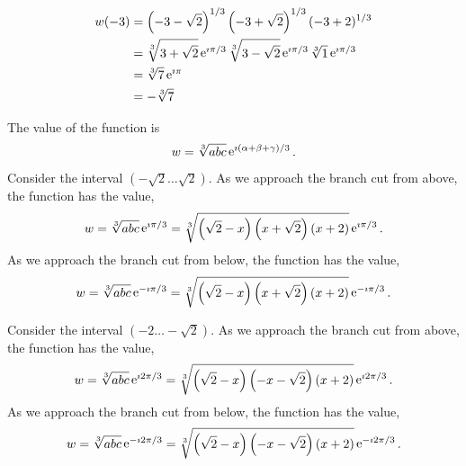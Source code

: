{\begin{Solution}
  \begin{align*}
    w(-3)   
    &= \left( -3 - \sqrt{2} \right)^{1/3}  \left( -3 + \sqrt{2} \right)^{1/3}  
    (-3 + 2)^{1/3} 
    \\
    &= \sqrt[3]{3 + \sqrt{2}} \mathop{\mathrm{e}}\nolimits^{\imath \pi / 3} 
    \sqrt[3]{3 - \sqrt{2}} \mathop{\mathrm{e}}\nolimits^{\imath \pi / 3} 
    \sqrt[3]{1} \mathop{\mathrm{e}}\nolimits^{\imath \pi / 3} 
    \\
    &= \sqrt[3]{7} \mathop{\mathrm{e}}\nolimits^{\imath \pi} 
    \\
    &= - \sqrt[3]{7}
  \end{align*}

  The value of the function is
  \[
  w = \sqrt[3]{a b c} \mathop{\mathrm{e}}\nolimits^{\imath (\alpha + \beta + \gamma) / 3}.
  \]
  Consider the interval $\left( -\sqrt{2} \ldots \sqrt{2} \right)$.  
  As we approach the branch cut from above, the function has the value,
  \[
  w = \sqrt[3]{a b c} \mathop{\mathrm{e}}\nolimits^{\imath \pi / 3} 
  = \sqrt[3]{ \left( \sqrt{2} - x \right)  \left( x + \sqrt{2} \right)
    (x + 2) } \mathop{\mathrm{e}}\nolimits^{\imath \pi / 3}.
  \]
  As we approach the branch cut from below, the function has the value,
  \[
  w = \sqrt[3]{a b c} \mathop{\mathrm{e}}\nolimits^{-\imath \pi / 3} 
  = \sqrt[3]{ \left( \sqrt{2} - x \right)  \left( x + \sqrt{2} \right)
    (x + 2) } \mathop{\mathrm{e}}\nolimits^{-\imath \pi / 3}.
  \]

  Consider the interval $\left( -2 \ldots -\sqrt{2} \right)$.  
  As we approach the branch cut from above, the function has the value,
  \[
  w = \sqrt[3]{a b c} \mathop{\mathrm{e}}\nolimits^{\imath 2 \pi / 3} 
  = \sqrt[3]{ \left( \sqrt{2} - x \right)  \left( - x - \sqrt{2} \right)
    (x + 2) } \mathop{\mathrm{e}}\nolimits^{\imath 2 \pi / 3}.
  \]
  As we approach the branch cut from below, the function has the value,
  \[
  w = \sqrt[3]{a b c} \mathop{\mathrm{e}}\nolimits^{-\imath 2 \pi / 3} 
  = \sqrt[3]{ \left( \sqrt{2} - x \right) \left( - x - \sqrt{2} \right)
    (x + 2) } \mathop{\mathrm{e}}\nolimits^{-\imath 2 \pi / 3}.
  \]
\end{Solution}
}









